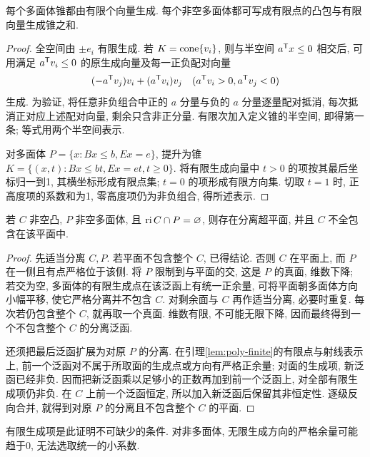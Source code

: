 \begin{lemma}\label{lem:poly-finite}
每个多面体锥都由有限个向量生成. 每个非空多面体都可写成有限点的凸包与有限向量生成锥之和.
\end{lemma}
\begin{proof}
全空间由 $\pm e_i$ 有限生成. 若 $K=\operatorname{cone}\{v_i\}$, 则与半空间 $a^{\mathsf T} x\le0$ 相交后, 可用满足 $a^{\mathsf T} v_i\le0$ 的原生成向量及每一正负配对向量
\[
(-a^{\mathsf T} v_j)v_i+(a^{\mathsf T} v_i)v_j\quad(a^{\mathsf T} v_i>0, a^{\mathsf T} v_j<0)
\]
生成. 为验证, 将任意非负组合中正的 $a$ 分量与负的 $a$ 分量逐量配对抵消, 每次抵消正对应上述配对向量, 剩余只含非正分量. 有限次加入定义锥的半空间, 即得第一条; 等式用两个半空间表示.

对多面体 $P=\{x:Bx\le b,Ex=e\}$, 提升为锥 $K=\{(x,t):Bx\le bt,Ex=et,t\ge0\}$. 将有限生成向量中 $t>0$ 的项按其最后坐标归一到1, 其横坐标形成有限点集; $t=0$ 的项形成有限方向集. 切取 $t=1$ 时, 正高度项的系数和为1, 零高度项仍为非负组合, 得所述表示.
\end{proof}
\begin{theorem}\label{thm:polyseparation}
若 $C$ 非空凸, $P$ 非空多面体, 且 $\operatorname{ri} C\cap P=\varnothing$, 则存在分离超平面, 并且 $C$ 不全包含在该平面中.
\end{theorem}
\begin{proof}
先适当分离 $C,P$. 若平面不包含整个 $C$, 已得结论. 否则 $C$ 在平面上, 而 $P$ 在一侧且有点严格位于该侧. 将 $P$ 限制到与平面的交, 这是 $P$ 的真面, 维数下降; 若交为空, 多面体的有限生成点在该泛函上有统一正余量, 可将平面朝多面体方向小幅平移, 使它严格分离并不包含 $C$. 对剩余面与 $C$ 再作适当分离, 必要时重复. 每次若仍包含整个 $C$, 就再取一个真面. 维数有限, 不可能无限下降, 因而最终得到一个不包含整个 $C$ 的分离泛函.

还须把最后泛函扩展为对原 $P$ 的分离. 在引理\ref{lem:poly-finite}的有限点与射线表示上, 前一个泛函对不属于所取面的生成点或方向有严格正余量; 对面的生成项, 新泛函已经非负. 因而把新泛函乘以足够小的正数再加到前一个泛函上, 对全部有限生成项仍非负. 在 $C$ 上前一个泛函恒定, 所以加入新泛函后保留其非恒定性. 逐级反向合并, 就得到对原 $P$ 的分离且不包含整个 $C$ 的平面.
\end{proof}
有限生成项是此证明不可缺少的条件. 对非多面体, 无限生成方向的严格余量可能趋于0, 无法选取统一的小系数.

